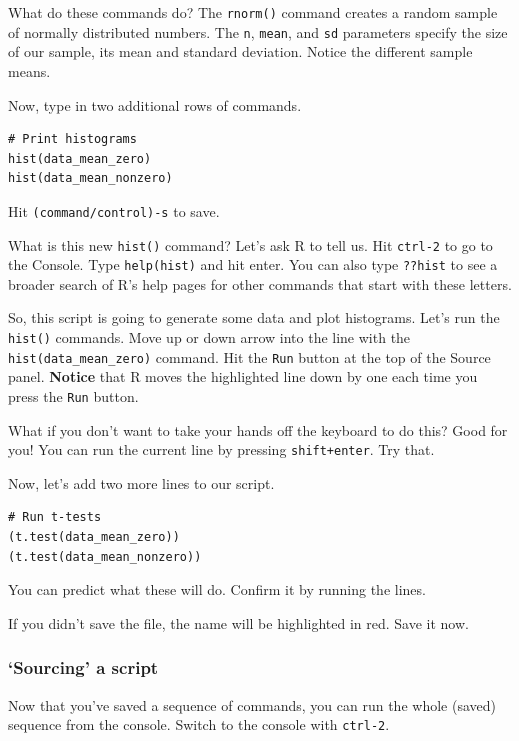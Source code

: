 \documentclass[]{article}
\begin{document}
What do these commands do? The \texttt{rnorm()} command creates a random
sample of normally distributed numbers. The \texttt{n}, \texttt{mean},
and \texttt{sd} parameters specify the size of our sample, its mean and
standard deviation. Notice the different sample means.

Now, type in two additional rows of commands.

\begin{verbatim}
# Print histograms
hist(data_mean_zero)
hist(data_mean_nonzero)
\end{verbatim}

Hit \texttt{(command/control)-s} to save.

What is this new \texttt{hist()} command? Let's ask R to tell us. Hit
\texttt{ctrl-2} to go to the Console. Type
\texttt{help(\textquotesingle{}hist\textquotesingle{})} and hit enter.
You can also type \texttt{??hist} to see a broader search of R's help
pages for other commands that start with these letters.

So, this script is going to generate some data and plot histograms.
Let's run the \texttt{hist()} commands. Move up or down arrow into the
line with the \texttt{hist(data\_mean\_zero)} command. Hit the
\texttt{Run} button at the top of the Source panel. \textbf{Notice} that
R moves the highlighted line down by one each time you press the
\texttt{Run} button.

What if you don't want to take your hands off the keyboard to do this?
Good for you! You can run the current line by pressing
\texttt{shift+enter}. Try that.

Now, let's add two more lines to our script.

\begin{verbatim}
# Run t-tests
(t.test(data_mean_zero))
(t.test(data_mean_nonzero))
\end{verbatim}

You can predict what these will do. Confirm it by running the lines.

If you didn't save the file, the name will be highlighted in red. Save
it now.

\subsubsection{\texorpdfstring{`Sourcing' a
script}{Sourcing a script}}\label{sourcing-a-script}

Now that you've saved a sequence of commands, you can run the whole
(saved) sequence from the console. Switch to the console with
\texttt{ctrl-2}.
\end{document}
